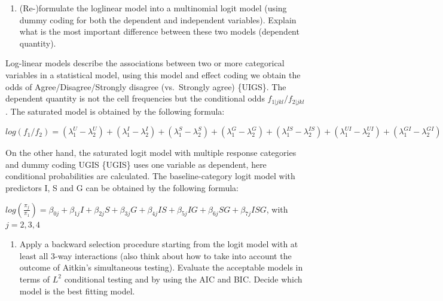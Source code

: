 \documentclass[
  12pt,
]{article}
\providecommand{\tightlist}{%
  \setlength{\itemsep}{0pt}\setlength{\parskip}{0pt}}
\begin{document}
\begin{enumerate}
\def\labelenumi{\arabic{enumi}.}
\setcounter{enumi}{2}
\tightlist
\item
  (Re-)formulate the loglinear model into a multinomial logit model (using dummy coding for both the dependent and independent variables). Explain what is the most important difference between these two models (dependent quantity).
\end{enumerate}

Log-linear models describe the associations between two or more categorical variables in a statistical model, using this model and effect coding we obtain the odds of Agree/Disagree/Strongly disagree (vs.~Strongly agree)  \{UIGS\}. The dependent quantity is not the cell frequencies but the conditional odds \(f_{1|jkl}/f_{2|jkl}\). The saturated model is obtained by the following formula:

\(log(f_{1}/f_{2}) = (\lambda_1^U-\lambda_2^U) + (\lambda_1^I-\lambda_2^I) + (\lambda_1^S-\lambda_2^S) + (\lambda_1^G-\lambda_2^G) + (\lambda_{1}^{IS}-\lambda_{2}^{IS})+(\lambda_{1}^{UI}-\lambda_{2}^{UI})+(\lambda_{1}^{GI}-\lambda_{2}^{GI})+ (\lambda_{1}^{SG}-\lambda_{2}^{SG})+(\lambda_{1}^{US}-\lambda_{2}^{US})+ (\lambda_{1}^{UG}-\lambda_{2}^{UG})+ (\lambda_{1}^{ISG}-\lambda_{2}^{ISG})+ (\lambda_{1}^{ISU}-\lambda_{2}^{ISU})+(\lambda_{1}^{IGU}-\lambda_{2}^{IGU})+(\lambda_{1}^{SGU}-\lambda_{2}^{SGU})+(\lambda_{1}^{UISG}-\lambda_{2}^{UISG})\)

On the other hand, the saturated logit model with multiple response categories and dummy coding U\textbar GIS \{UGIS\} uses one variable as dependent, here conditional probabilities are calculated. The baseline-category logit model with predictors I, S and G can be obtained by the following formula: 

\(log(\frac{\pi_j}{\pi_1})=\beta_{0j}+\beta_{1j}I+\beta_{2j}S+\beta_{3j}G+\beta_{4j}IS+\beta_{5j}IG+\beta_{6j}SG+\beta_{7j}ISG\), with \(j=2,3,4\)

\begin{enumerate}
\def\labelenumi{\arabic{enumi}.}
\setcounter{enumi}{3}
\tightlist
\item
  Apply a backward selection procedure starting from the logit model with at least all 3-way interactions (also think about how to take into account the outcome of Aitkin's simultaneous testing). Evaluate the acceptable models in terms of \(L^{2}\) conditional testing and by using the AIC and BIC. Decide which model is the best fitting model.
\end{enumerate}
\end{document}
